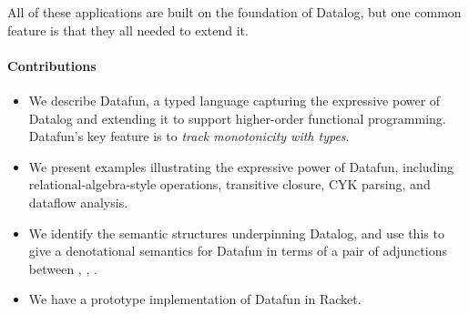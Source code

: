 All of these applications are built on the foundation of Datalog, but
one common feature is that they all needed to extend it.








\paragraph{Contributions}
\begin{itemize}
\item We describe Datafun, a typed language capturing the expressive power of
  Datalog and extending it to support higher-order functional programming.
  Datafun's key feature is to \emph{track monotonicity with types}.

\item We present examples illustrating the expressive power of Datafun,
  including relational-algebra-style operations, transitive closure, CYK
  parsing, and dataflow analysis.

\item We identify the semantic structures underpinning Datalog, and use this to
  give a denotational semantics for Datafun in terms of a pair of adjunctions
  between \cSet{}, \cPoset{}, \cSL{}.

\item We have a prototype implementation of Datafun in Racket. 
\end{itemize}







